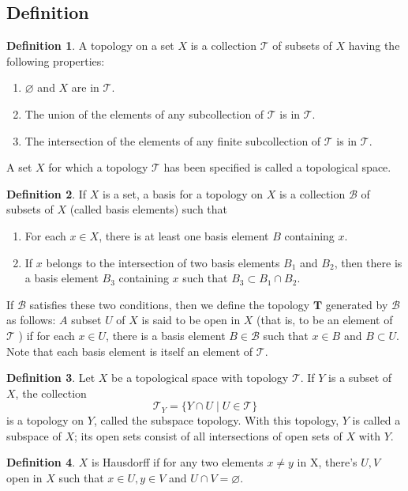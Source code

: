 \documentclass[12pt,a4paper]{book}
\newenvironment{enu}{\begin{enumerate}[(1)]}{\end{enumerate}}
\theoremstyle{definition}
\newtheorem{defn}{Definition}[section]
\begin{document}
\subsection{Definition}
\begin{defn}
    A topology on a set $X$ is a collection $\mathcal{T}$ of subsets of $X$ having the following properties:
    \begin{enu}
        \item $\varnothing$ and $X$ are in $\mathcal{T}$.
        \item The union of the elements of any subcollection of $\mathcal{T}$ is in $\mathcal{T}$.
        \item The intersection of the elements of any finite subcollection of $\mathcal{T}$ is in $\mathcal{T}$.
    \end{enu}
    A set $X$ for which a topology $\mathcal{T}$ has been specified is called a topological space.
\end{defn}
\begin{defn}
    If $X$ is a set, a basis for a topology on $X$ is a collection $\mathcal{B}$ of subsets of $X$ (called basis elements) such that
    \begin{enu}
        \item For each $x \in X$, there is at least one basis element $B$ containing $x$.
        \item  If $x$ belongs to the intersection of two basis elements $B_1$ and $B_2$, then there is a basis element $B_3$ containing $x$ such that $B_3 \subset B_1 \cap B_2$.
    \end{enu}
    If $\mathcal{B}$ satisfies these two conditions, then we define the topology $\boldsymbol{T}$ generated by $\mathcal{B}$ as follows: $A$ subset $U$ of $X$ is said to be open in $X$ (that is, to be an element of $\mathcal{T}$ ) if for each $x \in U$, there is a basis element $B \in \mathcal{B}$ such that $x \in B$ and $B \subset U$. Note that each basis element is itself an element of $\mathcal{T}$.
\end{defn}
\begin{defn}
    Let $X$ be a topological space with topology $\mathcal{T}$. If $Y$ is a subset of $X$, the collection
    $$
        \mathcal{T}_Y=\{Y \cap U \mid U \in \mathcal{T}\}
    $$
    is a topology on $Y$, called the subspace topology. With this topology, $Y$ is called a subspace of $X$; its open sets consist of all intersections of open sets of $X$ with $Y$.
\end{defn}
\begin{defn}
    $X$ is Hausdorff if for any two elements $x\neq y$ in X, there's $U,V$ open in $X$ such that $x\in U,y\in V$ and $U\cap V=\varnothing$.
\end{defn}
\end{document}
